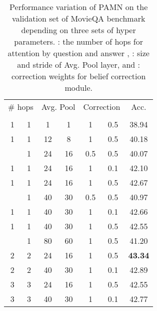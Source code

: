 \documentclass[10pt,twocolumn,letterpaper]{article}
\begin{document}
\begin{table}[t]
	\begin{center}
		\begin{tabular}{c c|c c|c c|c}
			\hline
			\multicolumn{2}{c|}{\# hops} & \multicolumn{2}{|c|}{Avg. Pool} & \multicolumn{2}{|c|}{Correction} & Acc.    \\
			     &      &            &            &    &   &        \\ \hline \hline
			1            & 1            & 1             & 1             & 1              & 0.5           & 38.94  \\
			1            & 1            & 12            & 8             & 1              & 0.5           & 40.18  \\ \hdashline
			1            & 1            & 24            & 16            & 0.5            & 0.5           & 40.07  \\
			1            & 1            & 24            & 16            & 1              & 0.1           & 42.10   \\
			1            & 1            & 24            & 16            & 1              & 0.5           & 42.67 \\ \hdashline
			1            & 1            & 40            & 30            & 0.5            & 0.5           & 40.97 \\
			1            & 1            & 40            & 30            & 1              & 0.1           & 42.66 \\
			1            & 1            & 40            & 30            & 1              & 0.5           & 42.55 \\ \hdashline
			1            & 1            & 80            & 60            & 1              & 0.5           & 41.20        \\ \hline
			2            & 2            & 24            & 16            & 1              & 0.5           & \textbf{43.34} \\
			2            & 2            & 40            & 30            & 1              & 0.1           & 42.89          \\ \hline
			3            & 3            & 24            & 16            & 1              & 0.5           & 42.55          \\
			3            & 3            & 40            & 30            & 1              & 0.1           & 42.77          \\ \hline
		\end{tabular}
	\end{center}
	\caption{Performance variation of PAMN on the validation set of MovieQA benchmark depending on three sets of hyper parameters. : the number of hops for attention by question  and answer , : size and stride of Avg. Pool layer, and : correction weights for belief correction module.}
	\label{tab:abl_2}
\end{table}
\end{document}
